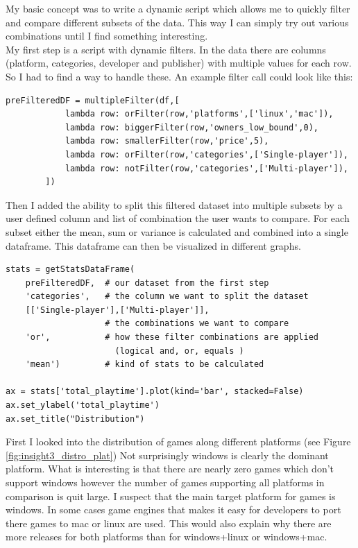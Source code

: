 \documentclass[11pt]{article}
\begin{document}
My basic concept was to write a dynamic script which allows me to quickly filter and compare different subsets of the data. This way I can simply try out various combinations until I find something interesting.\\
My first step is a script with dynamic filters. In the data there are columns (platform, categories, developer and publisher) with multiple values for each row. So I had to find a way to handle these. An example filter call could look like this:\\
\begin{minipage}{\linewidth}
\begin{lstlisting}
preFilteredDF = multipleFilter(df,[
            lambda row: orFilter(row,'platforms',['linux','mac']),
            lambda row: biggerFilter(row,'owners_low_bound',0),
            lambda row: smallerFilter(row,'price',5),
            lambda row: orFilter(row,'categories',['Single-player']),
            lambda row: notFilter(row,'categories',['Multi-player']),
        ])
\end{lstlisting}
\end{minipage}

Then I added the ability to split this filtered dataset into multiple subsets by a user defined column and list of combination the user wants to compare. For each subset either the mean, sum or variance is calculated and combined into a single dataframe. This dataframe can then be visualized in different graphs.

\begin{minipage}{\linewidth}
    \begin{lstlisting}
stats = getStatsDataFrame(
    preFilteredDF,  # our dataset from the first step
    'categories',   # the column we want to split the dataset
    [['Single-player'],['Multi-player']],
                    # the combinations we want to compare
    'or',           # how these filter combinations are applied 
                      (logical and, or, equals )
    'mean')         # kind of stats to be calculated

ax = stats['total_playtime'].plot(kind='bar', stacked=False)
ax.set_ylabel('total_playtime')
ax.set_title("Distribution")
    \end{lstlisting}
\end{minipage}

First I looked into the distribution of games along different platforms (see Figure \ref{fig:insight3_distro_plat}) Not surprisingly windows is clearly the dominant platform. What is interesting is that there are nearly zero games which don't support windows however the number of games supporting all platforms in comparison is quit large. 
I suspect that the main target platform for games is windows. In some cases game engines that makes it easy for developers to port there games to mac or linux are used. This would also explain why there are more releases for both platforms than for windows+linux or windows+mac.
\end{document}
